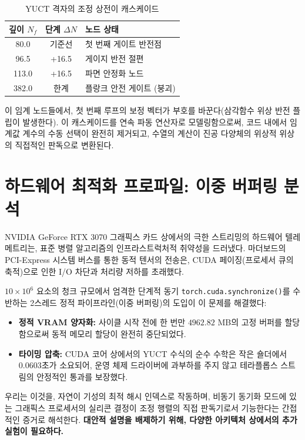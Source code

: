 \documentclass[11pt,a4paper]{article}
\begin{document}
	\begin{table}[h!]
		\centering
		\caption{YUCT 격자의 조정 상전이 캐스케이드}
		\label{tab:phase_transitions}
		\small
		\begin{tabular}{ccl}
			\toprule
			\textbf{깊이 $N_f$} & \textbf{단계 $\Delta N$} & \textbf{노드 상태} \\
			\midrule
			80.0  & 기준선 & 첫 번째 게이트 반전점 \\
			96.5  & +16.5 & 게이지 반전 절편 \\
			113.0 & +16.5 & 파면 안정화 노드 \\
			382.0 & 한계  & 플랑크 안전 게이트 (붕괴) \\
			\bottomrule
		\end{tabular}
	\end{table}
	
	이 임계 노드들에서, 첫 번째 루프의 보정 벡터가 부호를 바꾼다(삼각함수 위상 반전 플립이 발생한다). 이 캐스케이드를 연속 파동 연산자로 모델링함으로써, 코드 내에서 임계값 계수의 수동 선택이 완전히 제거되고, 수열의 계산이 진공 다양체의 위상적 위상의 직접적인 판독으로 변환된다.
	
	\section{하드웨어 최적화 프로파일: 이중 버퍼링 분석}
	NVIDIA GeForce RTX 3070 그래픽스 카드 상에서의 극한 스트리밍의 하드웨어 텔레메트리는, 표준 병렬 알고리즘의 인프라스트럭처적 취약성을 드러냈다. 마더보드의 PCI-Express 시스템 버스를 통한 동적 텐서의 전송은, CUDA 페이징(프로세서 큐의 축적)으로 인한 I/O 차단과 처리량 저하를 초래했다.
	
	$10 \times 10^6$ 요소의 청크 규모에서 엄격한 단계적 동기 \texttt{torch.cuda.synchronize()}를 수반하는 2스레드 정적 파이프라인(이중 버퍼링)의 도입이 이 문제를 해결했다:
	\begin{itemize}
		\item \textbf{정적 VRAM 양자화:} 사이클 시작 전에 한 번만 $4962.82$ MB의 고정 버퍼를 할당함으로써 동적 메모리 할당이 완전히 중단되었다.
		\item \textbf{타이밍 압축:} CUDA 코어 상에서의 YUCT 수식의 순수 수학은 작은 숄더에서 $0.0603$초가 소요되어, 운영 체제 드라이버에 과부하를 주지 않고 테라플롭스 스트림의 안정적인 통과를 보장했다.
	\end{itemize}
	우리는 이것을, 자연이 기성의 최적 해시 인덱스로 작동하며, 비동기 동기화 모드에 있는 그래픽스 프로세서의 실리콘 결정이 조정 행렬의 직접 판독기로서 기능한다는 간접적인 증거로 해석한다. \textbf{대안적 설명을 배제하기 위해, 다양한 아키텍처 상에서의 추가 실험이 필요하다.}
	
\end{document}
